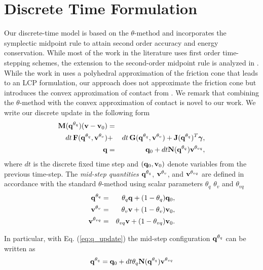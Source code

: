 \section{Discrete Time Formulation}
\label{sec:discrete_time_formulation}

Our discrete-time model is based on the $\theta\text{-method}$ \cite[\S
II.7]{bib:hairer2008solving} and incorporates the symplectic midpoint rule to
attain second order accuracy and energy conservation. While most of the work in
the literature uses first order time-stepping schemes, the extension to the
second-order midpoint rule is analyzed in \cite{bib:potra2006linearly}. While
the work in \cite{bib:potra2006linearly} uses a polyhedral approximation of the
friction cone that leads to an LCP formulation, our approach does not
approximate the friction cone but introduces the convex approximation of contact
from \cite{bib:anitescu2006} . We remark that combining the $\theta\text{-method}$ with the
convex approximation of contact is novel to our work. We write our discrete
update in the following form
\begin{eqnarray}
	\mf{M}(\mf{q}^{\theta_{q}})(\mf{v}-\mf{v}_0)  &=& \nonumber\\
	dt\,\mf{F}(\mf{q}^{\theta_{q}}, \mf{v}^{\theta_v}) &+&
	dt\,\mf{G}(\mf{q}^{\theta_{q}}, \mf{v}^{\theta_v}) +
	\mf{J}(\mf{q}^{\theta_{q}})^T\mf{\bgamma}, \label{eq:v_update}\\
	\mf{q} &=& \mf{q}_0 + dt\mf{N}(\mf{q}^{\theta_{q}})\mf{v}^{\theta_{vq}},
	\label{eq:q_update}
\end{eqnarray}
where $dt$ is the discrete fixed time step and $({\mathbf{q}}_0, {\mathbf{v}}_0)$ denote
variables from the previous time-step. The \emph{mid-step quantities} ${\mathbf{q}}^{\theta_{q}}$, ${\mathbf{v}}^{\theta_{v}}$, and
${\mathbf{v}}^{\theta_{vq}}$ are defined in accordance with the standard
$\theta\text{-method}$ using scalar parameters $\theta_q$ $\theta_v$ and
$\theta_{vq}$
\begin{eqnarray*}
	{\mathbf{q}}^{\theta_q} &=& \theta_q{\mathbf{q}} + (1-\theta_{q}){\mathbf{q}}_0,\\
	{\mathbf{v}}^{\theta_v} &=& \theta_v{\mathbf{v}} + (1-\theta_v){\mathbf{v}}_0,\\
	{\mathbf{v}}^{\theta_{vq}} &=& \theta_{vq}{\mathbf{v}} + (1-\theta_{vq}){\mathbf{v}}_0.
\end{eqnarray*}

In particular, with Eq. (\ref{eq:q_update}) the mid-step configuration ${\mathbf{q}}^{\theta_q}$ can be written as
\begin{equation}
	{\mathbf{q}}^{\theta_q} = {\mathbf{q}}_0 + dt\theta_q{\mathbf{N}}({\mathbf{q}}^{\theta_{q}}){\mathbf{v}}^{\theta_{vq}}
\end{equation}

